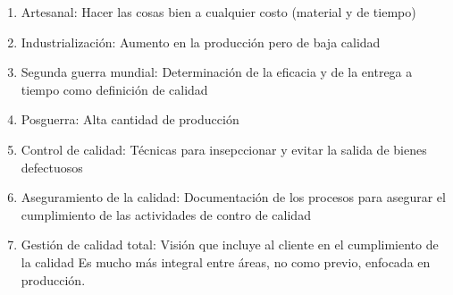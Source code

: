 

\begin{enumerate}
    \item Artesanal: Hacer las cosas bien a cualquier costo (material y de tiempo)
    \item Industrialización: Aumento en la producción pero de baja calidad
    \item Segunda guerra mundial: Determinación de la eficacia y de la entrega a tiempo como definición de calidad
    \item Posguerra: Alta cantidad de producción
    \item Control de calidad: Técnicas para insepccionar y evitar la salida de bienes defectuosos
    \item Aseguramiento de la calidad: Documentación de los procesos para asegurar el cumplimiento de las actividades de contro de calidad
    \item Gestión de calidad total: Visión que incluye al cliente en el cumplimiento de la calidad Es mucho más integral entre áreas, no como previo, enfocada en producción.
\end{enumerate}